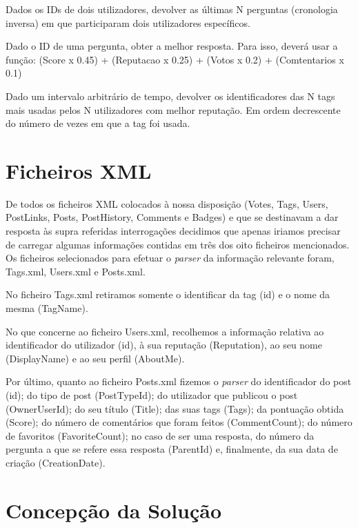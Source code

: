 \documentclass[a4paper]{report}
\begin{document}
\begin{itemize}
\begin{item} Dados os IDs de dois utilizadores, devolver as últimas N perguntas
(cronologia inversa) em que participaram dois utilizadores específicos.\end{item}
\begin{item} Dado o ID de uma pergunta, obter a melhor resposta.
Para isso, deverá usar a função:
(Score x 0.45) + (Reputacao x 0.25) + (Votos x 0.2) + (Comtentarios x 0.1)\end{item}
\begin{item} Dado um intervalo arbitrário de tempo, devolver os identificadores
das N tags mais usadas pelos N utilizadores com melhor reputação.
Em ordem decrescente do número de vezes em que a tag foi usada.\end{item}

\end{itemize}

\section{Ficheiros XML}
\label{sec:xml}

De todos os ficheiros XML colocados à nossa disposição (Votes, Tags, Users,
PostLinks, Posts, PostHistory, Comments e Badges) e que se destinavam a dar resposta
às supra referidas interrogações decidimos que apenas iriamos precisar de carregar
algumas informações contidas em três dos oito ficheiros mencionados.
Os ficheiros selecionados para efetuar o \textit{parser} da informação relevante
foram, Tags.xml, Users.xml e Posts.xml. \par
No ficheiro Tags.xml retiramos somente o identificar da tag (id) e o nome da mesma
(TagName). \par
No que concerne ao ficheiro Users.xml, recolhemos a informação relativa ao identificador
do utilizador (id), à sua reputação (Reputation), ao seu nome (DisplayName) e ao seu
perfil (AboutMe). \par
Por último, quanto ao ficheiro Posts.xml fizemos o \textit{parser} do identificador
do post (id); do tipo de post (PostTypeId); do utilizador que publicou o post
(OwnerUserId); do seu título (Title); das suas tags (Tags); da pontuação obtida
(Score); do número de comentários que foram feitos (CommentCount); do número de
favoritos (FavoriteCount); no caso de ser uma resposta, do número da pergunta a
que se refere essa resposta (ParentId) e, finalmente, da sua data de criação
(CreationDate).

\section{Concepção da Solução}
\label{sec:solucao}
\end{document}
